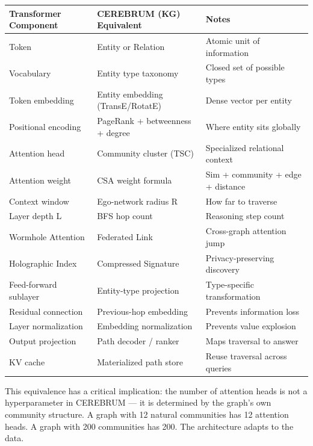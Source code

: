 \documentclass[10pt,journal,compsoc]{IEEEtran}
\begin{document}
\begin{center}
{\footnotesize
\begin{tabularx}{\columnwidth}{|>{\raggedright\arraybackslash}X|>{\raggedright\arraybackslash}X|>{\raggedright\arraybackslash}X|}
\hline
Transformer Component & CEREBRUM (KG) Equivalent & Notes \\ \hline
Token & Entity or Relation & Atomic unit of information \\ \hline
Vocabulary & Entity type taxonomy & Closed set of possible types \\ \hline
Token embedding & Entity embedding (TransE/RotatE) & Dense vector per entity \\ \hline
Positional encoding & PageRank + betweenness + degree & Where entity sits globally \\ \hline
Attention head & Community cluster (TSC) & Specialized relational context \\ \hline
Attention weight & CSA weight formula & Sim + community + edge + distance \\ \hline
Context window & Ego-network radius R & How far to traverse \\ \hline
Layer depth L & BFS hop count & Reasoning step count \\ \hline
Wormhole Attention & Federated Link & Cross-graph attention jump \\ \hline
Holographic Index & Compressed Signature & Privacy-preserving discovery \\ \hline
Feed-forward sublayer & Entity-type projection & Type-specific trans\-formation \\ \hline
Residual connection & Previous-hop embedding & Prevents information loss \\ \hline
Layer norma\-lization & Embedding norma\-lization & Prevents value explosion \\ \hline
Output projection & Path decoder / ranker & Maps traversal to answer \\ \hline
KV cache & Materi\-alized path store & Reuse traversal across queries \\ \hline
\end{tabularx}
}
\end{center}

This equivalence has a critical implication: \textit{}the number of attention heads is
not a hyper\-parameter in CEREBRUM — it is determined by the graph's own community
structure.\textit{} A graph with 12 natural communities has 12 attention heads. A graph
with 200 communities has 200. The archi\-tecture adapts to the data.
\end{document}

